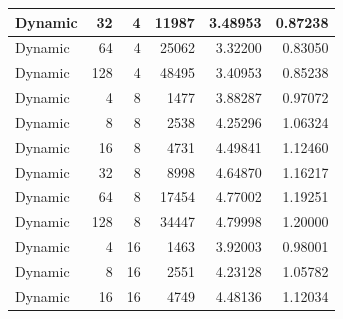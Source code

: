 \documentclass[journal,transmag]{IEEEtran}
\begin{document}
\begin{table}[h]
\begin{tabular}{|l|r|r|r|r|r|}
		Dynamic       & 32                           & 4                            & 11987                             & 3.48953                       & 0.87238                         \\ \hline
		Dynamic       & 64                           & 4                            & 25062                             & 3.32200                       & 0.83050                         \\ \hline
		Dynamic       & 128                          & 4                            & 48495                             & 3.40953                       & 0.85238                         \\ \hline
		Dynamic       & 4                            & 8                            & 1477                              & 3.88287                       & 0.97072                         \\ \hline
		Dynamic       & 8                            & 8                            & 2538                              & 4.25296                       & 1.06324                         \\ \hline
		Dynamic       & 16                           & 8                            & 4731                              & 4.49841                       & 1.12460                         \\ \hline
		Dynamic       & 32                           & 8                            & 8998                              & 4.64870                       & 1.16217                         \\ \hline
		Dynamic       & 64                           & 8                            & 17454                             & 4.77002                       & 1.19251                         \\ \hline
		Dynamic       & 128                          & 8                            & 34447                             & 4.79998                       & 1.20000                         \\ \hline
		Dynamic       & 4                            & 16                           & 1463                              & 3.92003                       & 0.98001                         \\ \hline
		Dynamic       & 8                            & 16                           & 2551                              & 4.23128                       & 1.05782                         \\ \hline
		Dynamic       & 16                           & 16                           & 4749                              & 4.48136                       & 1.12034                         \\ \hline

\end{tabular}
\end{table}
\end{document}
